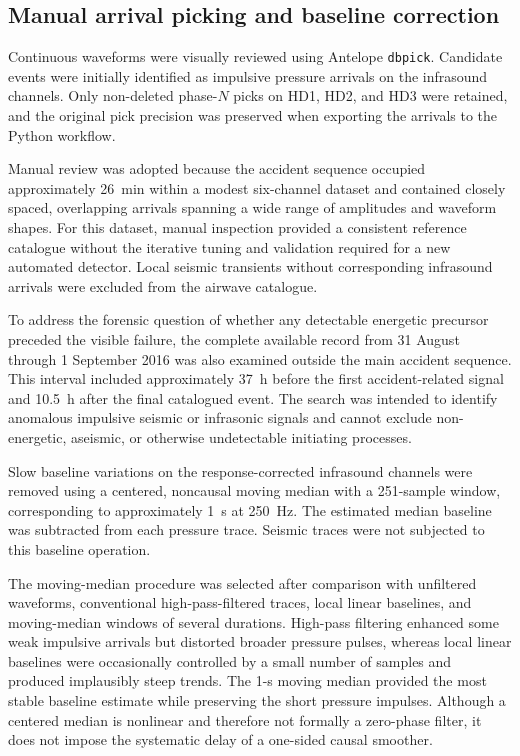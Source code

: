 \documentclass[]{seismica}
\begin{document}
\subsection{Manual arrival picking and baseline correction}

Continuous waveforms were visually reviewed using Antelope \texttt{dbpick}. Candidate events were initially identified as impulsive pressure arrivals on the infrasound channels. Only non-deleted phase-$N$ picks on HD1, HD2, and HD3 were retained, and the original pick precision was preserved when exporting the arrivals to the Python workflow.

Manual review was adopted because the accident sequence occupied approximately 26~min within a modest six-channel dataset and contained closely spaced, overlapping arrivals spanning a wide range of amplitudes and waveform shapes. For this dataset, manual inspection provided a consistent reference catalogue without the iterative tuning and validation required for a new automated detector. Local seismic transients without corresponding infrasound arrivals were excluded from the airwave catalogue.

To address the forensic question of whether any detectable energetic precursor
preceded the visible failure, the complete available record from 31 August
through 1 September 2016 was also examined outside the main accident sequence.
This interval included approximately 37~h before the first accident-related
signal and 10.5~h after the final catalogued event. The search was intended to
identify anomalous impulsive seismic or infrasonic signals and cannot exclude
non-energetic, aseismic, or otherwise undetectable initiating processes.

Slow baseline variations on the response-corrected infrasound channels were removed using a centered, noncausal moving median with a 251-sample window, corresponding to approximately 1~s at 250~Hz. The estimated median baseline was subtracted from each pressure trace. Seismic traces were not subjected to this baseline operation.

The moving-median procedure was selected after comparison with unfiltered waveforms, conventional high-pass-filtered traces, local linear baselines, and moving-median windows of several durations. High-pass filtering enhanced some weak impulsive arrivals but distorted broader pressure pulses, whereas local linear baselines were occasionally controlled by a small number of samples and produced implausibly steep trends. The 1-s moving median provided the most stable baseline estimate while preserving the short pressure impulses. Although a centered median is nonlinear and therefore not formally a zero-phase filter, it does not impose the systematic delay of a one-sided causal smoother.
\end{document}
